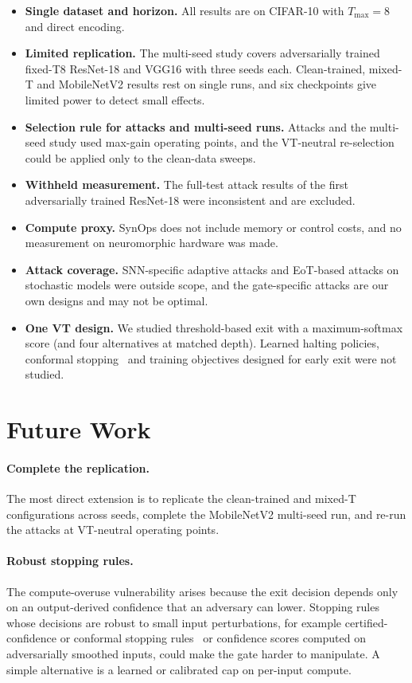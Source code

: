 \begin{itemize}
    \item \textbf{Single dataset and horizon.} All results are on CIFAR-10 with $T_{\max} = 8$ and direct encoding.
    \item \textbf{Limited replication.} The multi-seed study covers adversarially trained fixed-T8 ResNet-18 and VGG16 with three seeds each. Clean-trained, mixed-T and MobileNetV2 results rest on single runs, and six checkpoints give limited power to detect small effects.
    \item \textbf{Selection rule for attacks and multi-seed runs.} Attacks and the multi-seed study used max-gain operating points, and the VT-neutral re-selection could be applied only to the clean-data sweeps.
    \item \textbf{Withheld measurement.} The full-test attack results of the first adversarially trained ResNet-18 were inconsistent and are excluded.
    \item \textbf{Compute proxy.} SynOps does not include memory or control costs, and no measurement on neuromorphic hardware was made.
    \item \textbf{Attack coverage.} SNN-specific adaptive attacks and EoT-based attacks on stochastic models were outside scope, and the gate-specific attacks are our own designs and may not be optimal.
    \item \textbf{One VT design.} We studied threshold-based exit with a maximum-softmax score (and four alternatives at matched depth). Learned halting policies, conformal stopping~\cite{chen2025knowing} and training objectives designed for early exit were not studied.
\end{itemize}

\section{Future Work}
\label{sec:con-future}

\paragraph{Complete the replication.} The most direct extension is to replicate the clean-trained and mixed-T configurations across seeds, complete the MobileNetV2 multi-seed run, and re-run the attacks at VT-neutral operating points.

\paragraph{Robust stopping rules.} The compute-overuse vulnerability arises because the exit decision depends only on an output-derived confidence that an adversary can lower. Stopping rules whose decisions are robust to small input perturbations, for example certified-confidence or conformal stopping rules~\cite{chen2025knowing} or confidence scores computed on adversarially smoothed inputs, could make the gate harder to manipulate. A simple alternative is a learned or calibrated cap on per-input compute.

